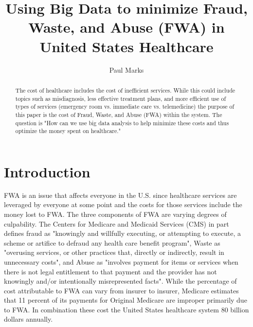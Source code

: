 \documentclass[sigconf]{acmart}
\begin{document}
\title{Using Big Data to minimize Fraud, Waste, and Abuse (FWA) in United States Healthcare}


\author{Paul Marks}


\begin{abstract}
The cost of healthcare includes the cost of inefficient services.  While this 
could include topics such as misdiagnosis, less effective treatment plans, 
and more efficient use of types of services (emergency room vs. immediate care 
vs. telemedicine) the purpose of this paper is the cost of Fraud, Waste, and 
Abuse (FWA) within the system.  The question is "How can we use big data analysis to 
help minimize these costs and thus optimize the money spent on healthcare."
\end{abstract}



\maketitle

\section{Introduction}

FWA is an issue that affects everyone in the U.S. since healthcare services are 
leveraged by everyone at some point and the costs for those services include the 
money lost to FWA.  The three components of FWA are varying degrees of 
culpability.  The Centers for Medicare and Medicaid Services (CMS) in part defines 
fraud as "knowingly and willfully executing, or attempting to execute, a scheme or 
artifice to defraud any health care benefit program", Waste as "overusing services, 
or other practices that, directly or indirectly, result in unnecessary costs", and 
Abuse as "involves payment for items or services when there is not legal entitlement 
to that payment and the provider has not knowingly and/or intentionally 
misrepresented facts"\cite{MLNFWA}.  While the percentage of cost attributable to 
FWA can vary from insurer to insurer, Medicare estimates that 11 percent of its 
payments for Original Medicare are improper primarily due to FWA.\cite{FY2016HHSFR}  
In combination these cost the United States healthcare system 80 billion 
dollars\cite{HFMA} annually.  
\end{document}
